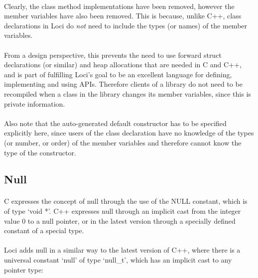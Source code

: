 \documentclass[12pt,twoside,notitlepage]{report}
\begin{document}
\paragraph{}
Clearly, the class method implementations have been removed, however the member variables have also been removed. This is because, unlike C++, class declarations in Loci do \emph{not} need to include the types (or names) of the member variables.

\paragraph{}
From a design perspective, this prevents the need to use forward struct declarations (or similar) and heap allocations that are needed in C and C++, and is part of fulfilling Loci's goal to be an excellent language for defining, implementing and using APIs. Therefore clients of a library do not need to be recompiled when a class in the library changes its member variables, since this is private information.

\paragraph{}
Also note that the auto-generated default constructor has to be specified explicitly here, since users of the class declaration have no knowledge of the types (or number, or order) of the member variables and therefore cannot know the type of the constructor.

\clearpage

\subsection{Null}

\paragraph{}
C expresses the concept of null through the use of the NULL constant, which is of type `void *'. C++ expresses null through an implicit cast from the integer value 0 to a null pointer, or in the latest version through a specially defined constant of a special type.

\paragraph{}
Loci adds null in a similar way to the latest version of C++, where there is a universal constant `null' of type `null\_t', which has an implicit cast to any pointer type:
\end{document}
